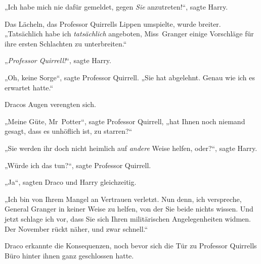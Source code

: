 „Ich habe mich nie dafür gemeldet, gegen \emph{Sie} anzutreten!“, sagte Harry.

Das Lächeln, das Professor Quirrells Lippen umspielte, wurde breiter.
„Tatsächlich habe ich \emph{tatsächlich} angeboten, Miss~Granger einige Vorschläge für ihre ersten Schlachten zu unterbreiten.“

„\emph{Professor Quirrell!}“, sagte Harry.

„Oh, keine Sorge“, sagte Professor Quirrell.
„Sie hat abgelehnt. Genau wie ich es erwartet hatte.“

Dracos Augen verengten sich.

„Meine Güte, Mr~Potter“, sagte Professor Quirrell, „hat Ihnen noch niemand gesagt, dass es unhöflich ist, zu starren?“

„Sie werden ihr doch nicht heimlich auf \emph{andere} Weise helfen, oder?“, sagte Harry.

„Würde ich das tun?“, sagte Professor Quirrell.

„Ja“, sagten Draco und Harry gleichzeitig.

„Ich bin von Ihrem Mangel an Vertrauen verletzt. Nun denn, ich verspreche, General Granger in keiner Weise zu helfen, von der Sie beide nichts wissen. Und jetzt schlage ich vor, dass Sie sich Ihren militärischen Angelegenheiten widmen. Der November rückt näher, und zwar schnell.“

\later

Draco erkannte die Konsequenzen, noch bevor sich die Tür zu Professor Quirrells Büro hinter ihnen ganz geschlossen hatte.

